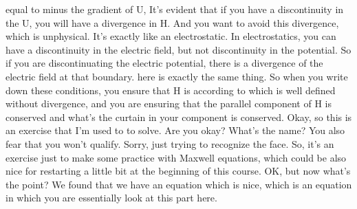 equal to minus the gradient of U, It's evident that if you have a discontinuity in the U, you will have a divergence in H. And you want to avoid this divergence, which is unphysical. It's exactly like an electrostatic. In electrostatics, you can have a discontinuity in the electric field, but not discontinuity in the potential. So if you are discontinuating the electric potential, there is a divergence of the electric field at that boundary. here is exactly the same thing. So when you write down these conditions, you ensure that H is according to which is well defined without divergence, and you are ensuring that the parallel component of H is conserved and what's the curtain in your component is conserved. Okay, so this is an exercise that I'm used to to solve. Are you okay? What's the name? You also fear that you won't qualify. Sorry, just trying to recognize the face. So, it's an exercise just to make some practice with Maxwell equations, which could be also nice for restarting a little bit at the beginning of this course. OK, but now what's the point? We found that we have an equation which is nice, which is an equation in which you are essentially look at this part here.

